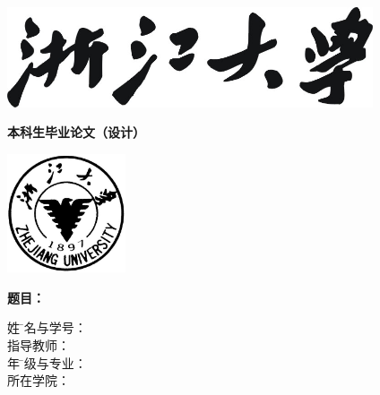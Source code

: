 
\thispagestyle{empty}

\vspace{5mm}

\begin{center}
   \includegraphics[width=108mm]{images/zjdx}
\end{center}

\centerline{\songti\erhao\textbf{本科生毕业论文（设计）}}

\vspace{4mm}

\begin{center}
  \includegraphics[width=35mm]{images/standxb}
\end{center}

\vspace{25mm}

{\hspace{0mm}\songti\sanhao\bfseries 题目：
  \hspace{2mm} \begin{minipage}[t]{120mm}\linespread{1.1}\uline{\zjutitlec}\end{minipage}}

\vspace{7mm}

\begin{tabbing}
    \hspace{30mm} \songti\sihao 姓 \hspace{-2.7mm} \= \songti\sihao 名与学号： \= \underline{\makebox[6cm]{\sihao\zjuauthornamec\hspace{3mm}\zjuauthorid}} \\[2mm]
              \> \songti\sihao 指导教师： \> \underline{\makebox[6cm]{\sihao\zjumentorc}} \\[2mm]
              \hspace{30mm} \songti\sihao 年 \hspace{-2.7mm} \= \songti\sihao 级与专业： \= \underline{\makebox[6cm]{\sihao\zjugrade\hspace{3mm}\zjumajor}} \\[2mm]
              \> \songti\sihao 所在学院： \> \underline{\makebox[6cm]{\sihao\zjucollegec}}
\end{tabbing}



